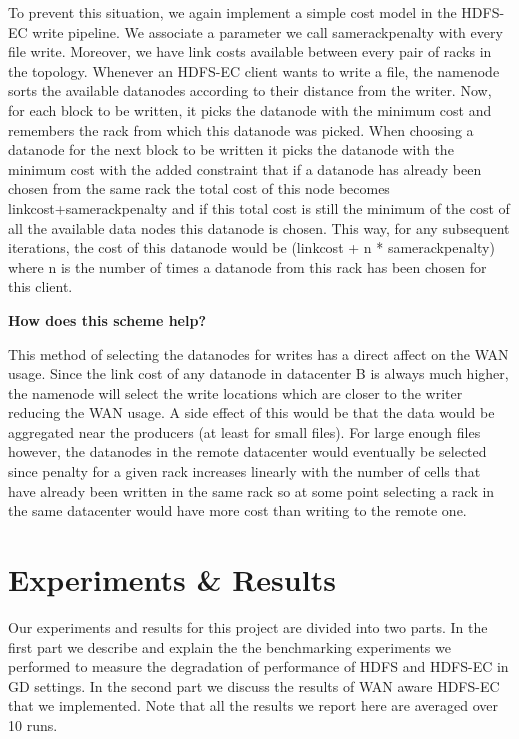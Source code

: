 \documentclass{sig-alternate-05-2015}
\begin{document}
To prevent this situation, we again implement a simple cost model in the HDFS-EC write pipeline. We associate a parameter we call samerackpenalty with every file write. Moreover, we have link costs available between every pair of racks in the topology. Whenever an HDFS-EC client wants to write a file, the namenode sorts the available datanodes according to their distance from the writer. Now, for each block to be written, it picks the datanode with the minimum cost and remembers the rack from which this datanode was picked. When choosing a datanode for the next block to be written it picks the datanode with the minimum cost with the added constraint that if a datanode has already been chosen from the same rack the total cost of this node becomes linkcost+samerackpenalty and if this total cost is still the minimum of the cost of all the available data nodes this  datanode is chosen. This way, for any subsequent iterations, the cost of this datanode would be (linkcost + n * samerackpenalty) where n is the number of times a datanode from this rack has been chosen for this client. 

\textbf{How does this scheme help?}

This method of selecting the datanodes for writes has a direct affect on the WAN usage. Since the link cost of any datanode in datacenter B is always much higher, the namenode will select the write locations which are closer to the writer reducing the WAN usage. A side effect of this would be that the data would be aggregated near the producers (at least for small files). For large enough files however, the datanodes in the remote datacenter would eventually be selected since penalty for a given rack increases linearly with the number of cells that have already been written in the same rack so at some point selecting a rack in the same datacenter would have more cost than writing to the remote one. 

\section{Experiments \& Results}

Our experiments and results for this project are divided into two parts. In the first part we describe and explain the the benchmarking experiments we performed to measure the degradation of performance of HDFS and HDFS-EC in GD settings. In the second part we discuss the results of WAN aware HDFS-EC that we implemented. Note that all the results we report here are averaged over 10 runs. %
\end{document}
